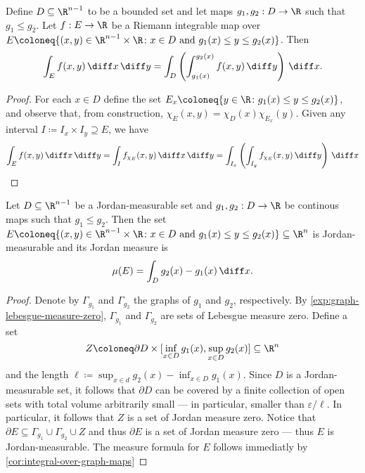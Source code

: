 \begin{corollary}
\label{cor:integral-over-graph-maps}
Define \(D \subseteq \R^{n-1}\) to be a bounded set and let maps \(g_{1}, g_{2}:
D \to \R\) such that \(g_1 \leq g_2\). Let \(f: E \to \R\) be a Riemann
integrable map over \(E \coloneq \{(x, y) \in \R^{n - 1} \times \R \colon x \in D
\text{ and } g_1(x) \leq y \leq g_2(x)\}\). Then
\[
  \int_E f(x, y)\, \diff x\, \diff y
  = \int_D \left( \int_{g_1(x)}^{g_2(x)} f(x, y)\, \diff y \right)\, \diff x.
\]
\end{corollary}

\begin{proof}
For each \(x \in D\) define the set \(E_x \coloneq \{y \in \R \colon g_{1}(x) \leq y
\leq g_2(x)\}\), and observe that, from construction, \(\chi_E(x, y) = \chi_D(x)
\chi_{E_x}(y)\). Given any interval \(I \coloneq I_x \times I_y \supseteq E\),
we have
\begin{align*}
  \int_E f(x, y)\, \diff x\, \diff y
  = \int_I f_{\chi_E}(x, y)\, \diff x\, \diff y
  = \int_{I_x} \left( \int_{I_y} f_{\chi_E}(x, y)\, \diff y  \right)\, \diff x
\end{align*}
\end{proof}

\begin{corollary}
\label{cor:measure-set-between-graphs-of-continuous-maps}
Let \(D \subseteq \R^{n-1}\) be a Jordan-measurable set and \(g_1, g_2: D \to
\R\) be continous maps such that \(g_1 \leq g_2\). Then the set \(E \coloneq
\{(x, y) \in \R^{n-1} \times \R \colon x \in D \text{ and } g_1(x) \leq y \leq
g_2(x)\} \subseteq \R^n\) is Jordan-measurable and its Jordan measure is
\[
  \mu(E) = \int_D g_2(x) - g_1(x)\, \diff x.
\]
\end{corollary}

\begin{proof}
Denote by \(\Gamma_{g_1}\) and \(\Gamma_{g_2}\) the graphs of \(g_1\) and
\(g_2\), respectively. By \cref{exp:graph-lebesgue-measure-zero},
\(\Gamma_{g_1}\) and \(\Gamma_{g_2}\) are sets of Lebesgue measure
zero. Define a set
\[
Z \coloneq \partial D \times
[\inf_{x \in D} g_1(x), \sup_{x \in D} g_2(x)] \subseteq \R^n
\] and the length \(\ell \coloneq \sup_{x
\in d} g_2(x) - \inf_{x \in D} g_1(x)\). Since \(D\) is a Jordan-measurable set,
it follows that \(\partial D\) can be covered by a finite collection of open
sets with total volume arbitrarily small --- in particular, smaller than
\(\varepsilon / \ell\). In particular, it follows that \(Z\) is a set of Jordan
measure zero. Notice that \(\partial E \subseteq \Gamma_{g_1} \cup
\Gamma_{g_2} \cup Z\) and thus \(\partial E\) is a set of Jordan measure zero
--- thus \(E\) is Jordan-measurable. The measure formula for \(E\) follows
immediatly by \cref{cor:integral-over-graph-maps}
\end{proof}

